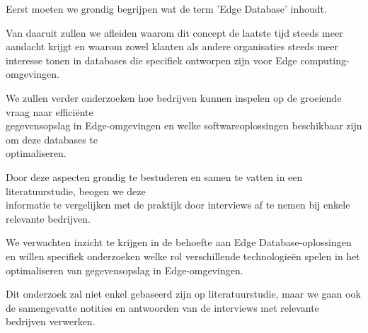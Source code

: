 \documentclass[dutch,dit,thesis]{hogentreport}
\begin{document}
Eerst moeten we grondig begrijpen wat de term 'Edge Database' inhoudt.

Van daaruit zullen we afleiden waarom dit concept de laatste tijd steeds meer aandacht krijgt
  en waarom zowel klanten als andere organisaties steeds meer interesse tonen in databases die specifiek ontworpen zijn voor
    Edge computing-omgevingen.
 
We zullen verder onderzoeken hoe bedrijven kunnen inspelen op de groeiende vraag naar efficiënte \\ gegevensopslag in Edge-omgevingen
  en welke softwareoplossingen beschikbaar zijn om deze databases te \\ optimaliseren.

Door deze aspecten grondig te bestuderen en samen te vatten in een literatuurstudie,
 beogen we deze \\ informatie te vergelijken met de praktijk door interviews af te nemen bij enkele relevante bedrijven.

We verwachten inzicht te krijgen in de behoefte aan Edge Database-oplossingen en willen specifiek onderzoeken welke rol
 verschillende technologieën spelen in het optimaliseren van gegevensopslag in Edge-omgevingen.

 Dit onderzoek zal niet enkel gebaseerd zijn op literatuurstudie, maar we gaan ook de samengevatte notities
  en antwoorden van de interviews met relevante bedrijven verwerken.



%


\backmatter{}

\setlength\bibitemsep{2pt} %
\printbibliography[heading=bibintoc]
\end{document}
